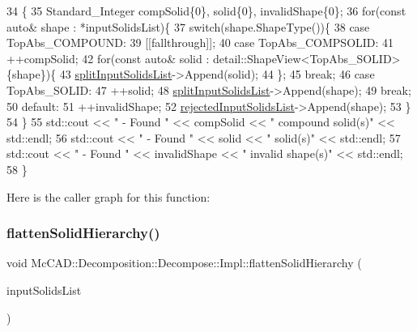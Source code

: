 \begin{DoxyCode}
34                                                                 \{
35     Standard\_Integer compSolid\{0\}, solid\{0\}, invalidShape\{0\};
36     \textcolor{keywordflow}{for}(\textcolor{keyword}{const} \textcolor{keyword}{auto}& shape : *inputSolidsList)\{
37         \textcolor{keywordflow}{switch}(shape.ShapeType())\{
38         \textcolor{keywordflow}{case} TopAbs\_COMPOUND:
39             [[fallthrough]];
40         \textcolor{keywordflow}{case} TopAbs\_COMPSOLID:
41             ++compSolid;
42             \textcolor{keywordflow}{for}(\textcolor{keyword}{const} \textcolor{keyword}{auto}& solid : detail::ShapeView<TopAbs\_SOLID>\{shape\})\{
43                 \hyperlink{classMcCAD_1_1Decomposition_1_1Decompose_1_1Impl_a9da06719a71fdc8438190a3c3112e82b}{splitInputSolidsList}->Append(solid);
44             \};
45             \textcolor{keywordflow}{break};
46         \textcolor{keywordflow}{case} TopAbs\_SOLID:
47             ++solid;
48             \hyperlink{classMcCAD_1_1Decomposition_1_1Decompose_1_1Impl_a9da06719a71fdc8438190a3c3112e82b}{splitInputSolidsList}->Append(shape);
49             \textcolor{keywordflow}{break};
50         \textcolor{keywordflow}{default}:
51             ++invalidShape;
52             \hyperlink{classMcCAD_1_1Decomposition_1_1Decompose_1_1Impl_afa4c71b9552009320911095b0e9c638e}{rejectedInputSolidsList}->Append(shape);
53         \}
54     \}
55     std::cout << \textcolor{stringliteral}{"   - Found "} << compSolid << \textcolor{stringliteral}{" compound solid(s)"} << std::endl;
56     std::cout << \textcolor{stringliteral}{"   - Found "} << solid << \textcolor{stringliteral}{" solid(s)"} << std::endl;
57     std::cout << \textcolor{stringliteral}{"   - Found "} << invalidShape << \textcolor{stringliteral}{" invalid shape(s)"} << std::endl;
58 \}
\end{DoxyCode}
Here is the caller graph for this function\+:
\mbox{\label{classMcCAD_1_1Decomposition_1_1Decompose_1_1Impl_ab0605ffa40a113571d949c93e5994122}} 
\subsubsection{\texorpdfstring{flatten\+Solid\+Hierarchy()}{flattenSolidHierarchy()}\hspace{0.1cm}{\footnotesize\ttfamily [2/2]}}
{\footnotesize\ttfamily void Mc\+C\+A\+D\+::\+Decomposition\+::\+Decompose\+::\+Impl\+::flatten\+Solid\+Hierarchy (\begin{DoxyParamCaption}\item[{const Handle\+\_\+\+Top\+Tools\+\_\+\+H\+Sequence\+Of\+Shape \&}]{input\+Solids\+List }\end{DoxyParamCaption})}

